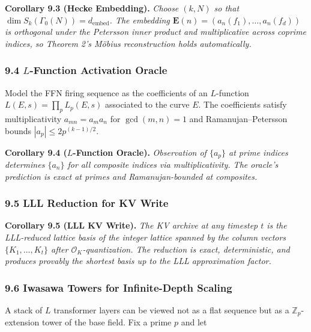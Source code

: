 \documentclass[
  11pt,
]{article}
\begin{document}
\textbf{Corollary 9.3 (Hecke Embedding).} \emph{Choose \((k, N)\) so
that \(\dim S_k(\Gamma_0(N)) = d_{\mathrm{embed}}\). The embedding
\(\mathbf{E}(n) = (a_n(f_1), \dots, a_n(f_d))\) is orthogonal under the
Petersson inner product and multiplicative across coprime indices, so
Theorem 2's Möbius reconstruction holds automatically.}

\hypertarget{l-function-activation-oracle}{%
\subsubsection{\texorpdfstring{9.4 \(L\)-Function Activation
Oracle}{9.4 L-Function Activation Oracle}}\label{l-function-activation-oracle}}

Model the FFN firing sequence as the coefficients of an \(L\)-function
\(L(E, s) = \prod_p L_p(E, s)\) associated to the curve \(E\). The
coefficients satisfy multiplicativity \(a_{mn} = a_m a_n\) for
\(\gcd(m, n) = 1\) and Ramanujan--Petersson bounds
\(|a_p| \leq 2 p^{(k-1)/2}\).

\textbf{Corollary 9.4 (\(L\)-Function Oracle).} \emph{Observation of
\(\{a_p\}\) at prime indices determines \(\{a_n\}\) for all composite
indices via multiplicativity. The oracle's prediction is exact at primes
and Ramanujan-bounded at composites.}

\hypertarget{lll-reduction-for-kv-write}{%
\subsubsection{9.5 LLL Reduction for KV
Write}\label{lll-reduction-for-kv-write}}

\textbf{Corollary 9.5 (LLL KV Write).} \emph{The KV archive at any
timestep \(t\) is the LLL-reduced lattice basis of the integer lattice
spanned by the column vectors \(\{K_1, \dots, K_t\}\) after
\(\mathcal{O}_K\)-quantization. The reduction is exact, deterministic,
and produces provably the shortest basis up to the LLL approximation
factor.}

\hypertarget{iwasawa-towers-for-infinite-depth-scaling}{%
\subsubsection{9.6 Iwasawa Towers for Infinite-Depth
Scaling}\label{iwasawa-towers-for-infinite-depth-scaling}}

A stack of \(L\) transformer layers can be viewed not as a flat sequence
but as a \(\mathbb{Z}_p\)-extension tower of the base field. Fix a prime
\(p\) and let
\end{document}
